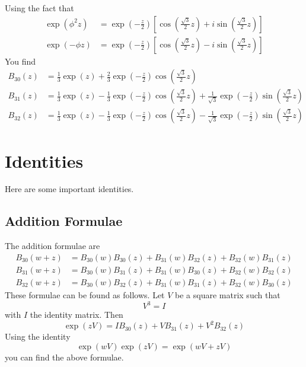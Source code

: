 Using the fact that
\begin{align}
    \exp\left( \phi^{2} z \right) &= \exp\left(-\frac{z}{2}\right) \left[ \cos\left( \frac{\sqrt{3}}{2}z \right) + i \sin\left( \frac{\sqrt{3}}{2}z \right) \right] \\
    \exp\left( -\phi z \right) &= \exp\left(-\frac{z}{2}\right) \left[ \cos\left( \frac{\sqrt{3}}{2}z \right) - i \sin\left( \frac{\sqrt{3}}{2}z \right) \right]
\end{align}
You find
\begin{align}
    B_{30}(z) &= \frac{1}{3} \exp(z) + \frac{2}{3} \exp\left( -\frac{z}{2} \right) \cos\left( \frac{\sqrt{3}}{2} z \right) \\
    B_{31}(z) &= \frac{1}{3} \exp(z) - \frac{1}{3} \exp\left( -\frac{z}{2} \right) \cos\left( \frac{\sqrt{3}}{2} z \right) + \frac{1}{\sqrt{3}} \exp\left( -\frac{z}{2} \right) \sin\left( \frac{\sqrt{3}}{2} z \right) \\
    B_{32}(z) &= \frac{1}{3} \exp(z) - \frac{1}{3} \exp\left( -\frac{z}{2} \right) \cos\left( \frac{\sqrt{3}}{2} z \right) - \frac{1}{\sqrt{3}} \exp\left( -\frac{z}{2} \right) \sin\left( \frac{\sqrt{3}}{2} z \right)
\end{align}
\section{Identities}
Here are some important identities.
\subsection{Addition Formulae}
The addition formulae are
\begin{align}
    B_{30}(w + z) &= B_{30}(w) B_{30}(z) + B_{31}(w) B_{32}(z) + B_{32}(w) B_{31}(z) \\
    B_{31}(w + z) &= B_{30}(w) B_{31}(z) + B_{31}(w) B_{30}(z) + B_{32}(w) B_{32}(z) \\
    B_{32}(w + z) &= B_{30}(w) B_{32}(z) + B_{31}(w) B_{31}(z) + B_{32}(w) B_{30}(z)
\end{align}
These formulae can be found as follows. Let $V$ be a square matrix such that
\begin{equation}
    V^{3} = I
\end{equation}
with $I$ the identity matrix. Then
\begin{equation}
    \exp\left( z V \right) = I B_{30}(z) + V B_{31}(z) + V^{2} B_{32}(z)
\end{equation}
Using the identity
\begin{equation}
    \exp\left( w V \right) \exp\left( z V \right) = \exp\left( wV + zV \right)
\end{equation}
you can find the above formulae.
